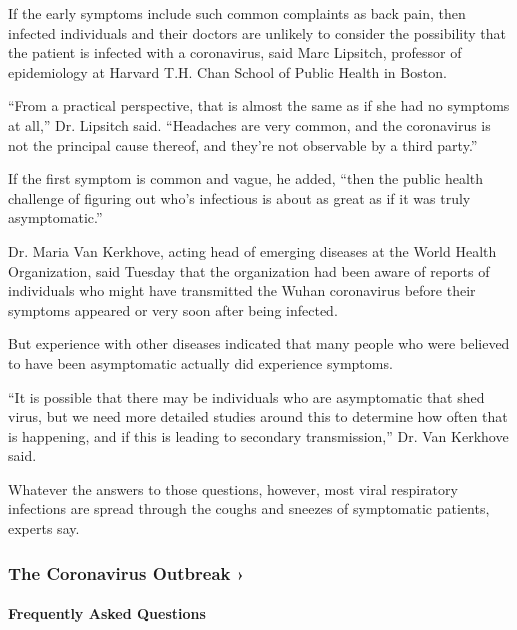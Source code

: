 If the early symptoms include such common complaints as back pain, then
infected individuals and their doctors are unlikely to consider the
possibility that the patient is infected with a coronavirus, said Marc
Lipsitch, professor of epidemiology at Harvard T.H. Chan School of
Public Health in Boston.

``From a practical perspective, that is almost the same as if she had no
symptoms at all,'' Dr. Lipsitch said. ``Headaches are very common, and
the coronavirus is not the principal cause thereof, and they're not
observable by a third party.''

If the first symptom is common and vague, he added, ``then the public
health challenge of figuring out who's infectious is about as great as
if it was truly asymptomatic.''

Dr. Maria Van Kerkhove, acting head of emerging diseases at the World
Health Organization, said Tuesday that the organization had been aware
of reports of individuals who might have transmitted the Wuhan
coronavirus before their symptoms appeared or very soon after being
infected.

But experience with other diseases indicated that many people who were
believed to have been asymptomatic actually did experience symptoms.

``It is possible that there may be individuals who are asymptomatic that
shed virus, but we need more detailed studies around this to determine
how often that is happening, and if this is leading to secondary
transmission,'' Dr. Van Kerkhove said.

Whatever the answers to those questions, however, most viral respiratory
infections are spread through the coughs and sneezes of symptomatic
patients, experts say.

\href{https://www.nytimes.com/news-event/coronavirus?action=click\&pgtype=Article\&state=default\&region=MAIN_CONTENT_3\&context=storylines_faq}{}

\hypertarget{the-coronavirus-outbreak-}{%
\subsubsection{The Coronavirus Outbreak
›}\label{the-coronavirus-outbreak-}}

\hypertarget{frequently-asked-questions}{%
\paragraph{Frequently Asked
Questions}\label{frequently-asked-questions}}

